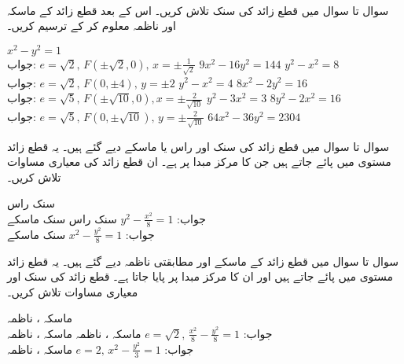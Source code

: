 \\
سوال  تا سوال  میں قطع زائد کی سنک تلاش کریں۔ اس کے بعد قطع زائد کے ماسکہ اور ناظمہ معلوم کر کے ترسیم کریں۔

$x^2-y^2=1$\\
جواب:\quad
$e=\sqrt{2},\, F(\pm\sqrt{2},0),\,x=\pm\tfrac{1}{\sqrt{2}}$
$9x^2-16y^2=144$
$y^2-x^2=8$\\
جواب:\quad
$e=\sqrt{2},\, F(0,\pm 4),\, y=\pm 2$
$y^2-x^2=4$
$8x^2-2y^2=16$\\
جواب:\quad
$e=\sqrt{5},\, F(\pm \sqrt{10},0),x=\pm\tfrac{2}{\sqrt{10}}$
$y^2-3x^2=3$
$8y^2-2x^2=16$\\
جواب:\quad
$e=\sqrt{5},\, F(0,\pm\sqrt{10}),\,y=\pm\tfrac{2}{\sqrt{10}}$
$64x^2-36y^2=2304$

سوال تا سوال  میں قطع زائد کی سنک اور راس یا ماسکے دیے گئے ہیں۔ یہ قطع زائد  مستوی میں پائے جاتے ہیں جن کا مرکز مبدا پر ہے۔ ان قطع زائد کی  معیاری مساوات تلاش کریں۔

سنک  راس \\
جواب:\quad
$y^2-\tfrac{x^2}{8}=1$
سنک  راس 
سنک  ماسکے \\
جواب:\quad
$x^2-\tfrac{y^2}{8}=1$
سنک  ماسکے 

سوال  تا سوال  میں قطع زائد کے ماسکے اور مطابقتی ناظمہ دیے گئے ہیں۔ یہ قطع زائد  مستوی میں پائے جاتے ہیں اور ان کا مرکز مبدا پر پایا جاتا ہے۔ قطع زائد کی سنک اور معیاری مساوات تلاش کریں۔

ماسکہ ، ناظمہ \\
جواب:\quad
$e=\sqrt{2},\,\tfrac{x^2}{8}-\tfrac{y^2}{8}=1$
ماسکہ ، ناظمہ 
ماسکہ ، ناظمہ \\
جواب:\quad
$e=2,\,x^2-\tfrac{y^2}{3}=1$
ماسکہ ، ناظمہ 

